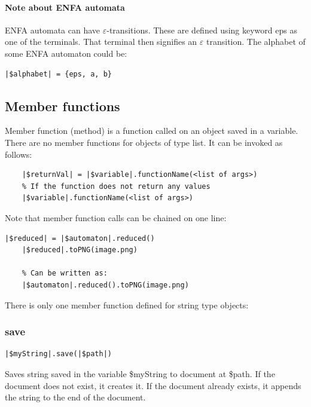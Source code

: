 \documentclass{ctuthesis}
\begin{document}
\paragraph{Note about ENFA automata}
ENFA automata can have $\varepsilon$-transitions. These are defined using keyword eps as one of the terminals. That terminal then signifies an $\varepsilon$ transition. The alphabet of some ENFA automaton could be:
\begin{lstlisting}[language = JASL]
	|$alphabet| = {eps, a, b}
\end{lstlisting} 

\subsection{Member functions}
\label{subsec:member-functions}
Member function (method) is a function called on an object saved in a variable. There are no member functions for objects of type list. It can be invoked as follows:

\begin{minipage}{\linewidth}
\begin{lstlisting}[language = JASL_snippet]
	% If the function returns some value	
	|$returnVal| = |$variable|.functionName(<list of args>)	
	% If the function does not return any values
	|$variable|.functionName(<list of args>)
\end{lstlisting}
\end{minipage} 

Note that member function calls can be chained on one line:

\begin{minipage}{\linewidth}
\begin{lstlisting}[language = JASL]
	|$reduced| = |$automaton|.reduced()
	|$reduced|.toPNG(image.png)
	
	% Can be written as:
	|$automaton|.reduced().toPNG(image.png)
\end{lstlisting}
\end{minipage}

There is only one member function defined for string type objects:
\subsubsection{save}
\begin{lstlisting}[language = JASL_snippet]
	|$myString|.save(|$path|)
\end{lstlisting}

Saves string saved in the variable \$myString to document at \$path. If the document does not exist, it creates it. If the document already exists, it appends the string to the end of the document.
\end{document}
